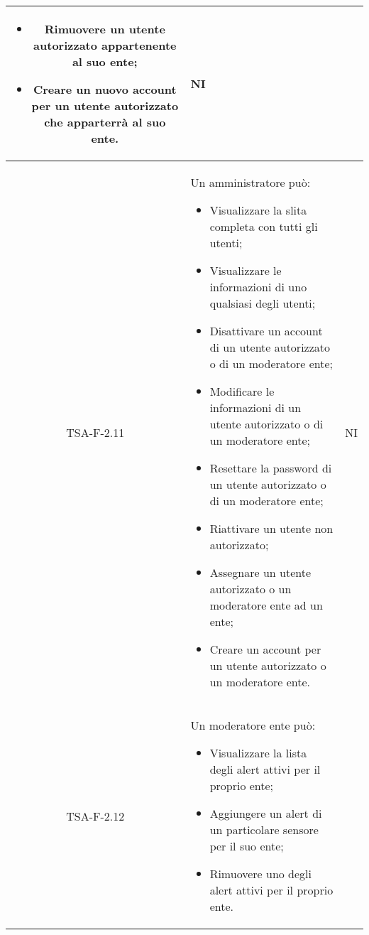 \begin{center}
\begin{longtable}{|c|p{10cm}|c|}
\begin{itemize}
			 	\item Rimuovere un utente autorizzato appartenente al suo ente;
			 	\item Creare un nuovo account per un utente autorizzato che apparterrà al suo ente.
			 \end{itemize} & NI \\
			 \hline
			 TSA-F-2.11 & Un amministratore può: 
			 \begin{itemize}
			 	\item Visualizzare la slita completa con tutti gli utenti;
			 	\item Visualizzare le informazioni di uno qualsiasi degli utenti;
			 	\item Disattivare un account di un utente autorizzato o di un moderatore ente;
			 	\item Modificare le informazioni di un utente autorizzato o di un moderatore ente;
			 	\item Resettare la password di un utente autorizzato o di un moderatore ente;
			 	\item Riattivare un utente non autorizzato;
			 	\item Assegnare un utente autorizzato o un moderatore ente ad un ente;
			 	\item Creare un account per un utente autorizzato o un moderatore ente.  
			 \end{itemize} & NI \\
			 \hline
			 TSA-F-2.12 & Un moderatore ente può: 
			 \begin{itemize}
			 	\item Visualizzare la lista degli alert attivi per il proprio ente;
			 	\item Aggiungere un alert di un particolare sensore per il suo ente;
			 	\item Rimuovere uno degli alert attivi per il proprio ente.


\end{itemize}
\end{longtable}
\end{center}

